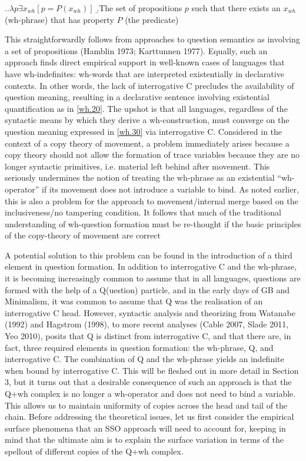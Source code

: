 \documentclass[charis]{glossa}
\begin{document}
\ex.\label{wh.30}\a.$\lambda p\exists x_{wh}[p = P(x_{wh})]$
   \b.The set of propositions $p$ such that there exists an $x_{wh}$ (wh-phrase) that has property $P$ (the predicate)

This straightforwardly follows from approaches to question semantics as involving a set of propositions (Hamblin 1973; Karttunnen 1977).  Equally, such an approach finds direct empirical support in well-known cases of languages that have wh-indefinites: wh-words that are interpreted existentially in declarative contexts. In other words, the lack of interrogative C precludes the availability of question meaning, resulting in a declarative sentence involving existential quantification as in \ref{wh.20}. The upshot is that all languages, regardless of the syntactic means by which they derive a wh-construction, must converge on the question meaning expressed in \ref{wh.30} via interrogative C. Considered in the context of a copy theory of movement, a problem immediately arises because a copy theory should not allow the formation of trace variables because they are no longer syntactic primitives, i.e. material left behind after movement. This seriously undermines the notion of treating the wh-phrase as an existential ``wh-operator'' if its movement does not introduce a variable to bind.  As noted earlier, this is also a problem for the approach to movement/internal merge based on the inclusiveness/no tampering condition.  It follows that much of the traditional understanding of wh-question formation must be re-thought if the basic principles of the copy-theory of movement are correct


A potential solution to this problem can be found in the introduction of a third element in question formation. In addition to interrogative C and the wh-phrase, it is becoming increasingly common to assume that in all languages, questions are formed with the help of a Q(uestion) particle, and in the early days of GB and Minimalism, it was common to assume that Q was the realisation of an interrogative C head. However, syntactic analysis and theorizing from Watanabe (1992) and Hagstrom (1998), to more recent analyses (Cable 2007, Slade 2011, Yeo 2010), posits that Q is distinct from interrogative C, and that there are, in fact, three required elements in question formation: the wh-phrase, Q, and interrogative C. The combination of Q and the wh-phrase yields an indefinite when bound by interrogative C. This will be fleshed out in more detail in Section 3, but it turns out that a desirable consequence of such an approach is that the Q+wh complex is no longer a wh-operator and does not need to bind a variable. This allows us to maintain uniformity of copies across the head and tail of the chain. Before addressing the theoretical issues, let us first consider the empirical surface phenomena that an SSO approach will need to account for, keeping in mind that the ultimate aim is to explain the surface variation in terms of the spellout of different copies of the Q+wh complex.
\end{document}

